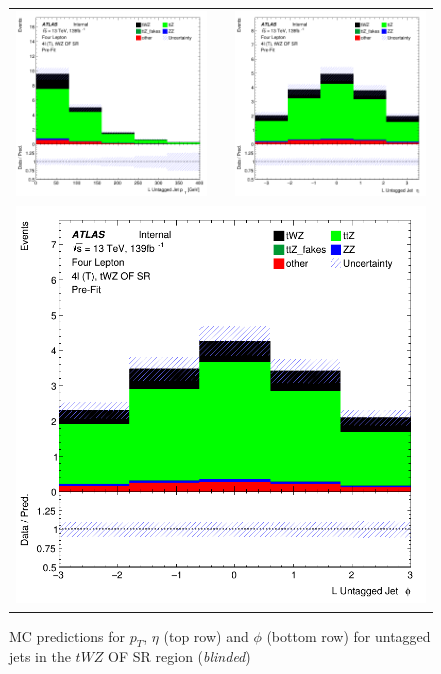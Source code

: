 \begin{figure}[htbp]
\centering
  \begin{tabular}{ccc}

    \includegraphics[width=.2\textwidth]{figures/PreFitPlots/lep4_tWZ_4T_OF_L_UntaggedJet_pt} & &
    \includegraphics[width=.2\textwidth]{figures/PreFitPlots/lep4_tWZ_4T_OF_L_UntaggedJet_eta} \\
    \multicolumn{3}{c}{\includegraphics[width=.2\textwidth]{figures/PreFitPlots/lep4_tWZ_4T_OF_L_UntaggedJet_phi}}
  \end{tabular}
      \caption{MC predictions for $p_{T}$, $\eta$ (top row) and $\phi$ (bottom row) for untagged jets in the $tWZ$ OF SR region (\textit{blinded})}
  \label{fig:4lep-OF-SR-UntaggedjetPlots}
\end{figure}

